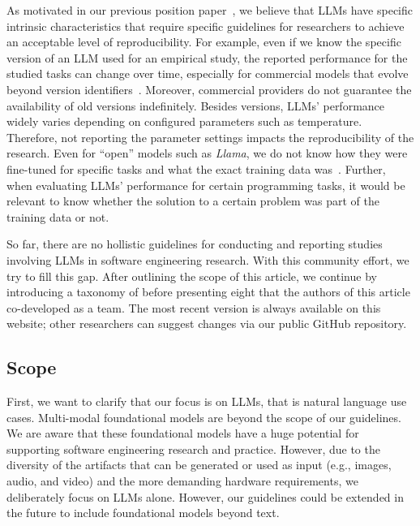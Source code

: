 As motivated in our previous position paper~\cite{DBLP:conf/wsese/0001BFB25}, we believe that LLMs have specific intrinsic characteristics that require specific guidelines for researchers to achieve an acceptable level of reproducibility.
For example, even if we know the specific version of an LLM used for an empirical study, the reported performance for the studied tasks can change over time, especially for commercial models that evolve beyond version identifiers~\cite{DBLP:journals/corr/abs-2307-09009}.
Moreover, commercial providers do not guarantee the availability of old versions indefinitely.
Besides versions, LLMs' performance widely varies depending on configured parameters such as temperature.
Therefore, not reporting the parameter settings impacts the reproducibility of the research.
Even for ``open'' models such as \emph{Llama}, we do not know how they were fine-tuned for specific tasks and what the exact training data was~\cite{Gibney2024}.
Further, when evaluating LLMs' performance for certain programming tasks, it would be relevant to know whether the solution to a certain problem was part of the training data or not.

So far, there are no hollistic guidelines for conducting and reporting studies involving LLMs in software engineering research.
With this community effort, we try to fill this gap.
After outlining the scope of this article, we continue by introducing a taxonomy of \studytypes before presenting eight \guidelines that the authors of this article co-developed as a team.
The most recent version is always available on this website; other researchers can suggest changes via our public GitHub repository.

\subsection{Scope}
\label{sec:scope}

First, we want to clarify that our focus is on LLMs, that is natural language use cases.
Multi-modal foundational models are beyond the scope of our guidelines.
We are aware that these foundational models have a huge potential for supporting software engineering research and practice.
However, due to the diversity of  the artifacts that can be generated or used as input (e.g., images, audio, and video) and the more demanding hardware requirements, we deliberately focus on LLMs alone.
However, our guidelines could be extended in the future to include foundational models beyond text.

